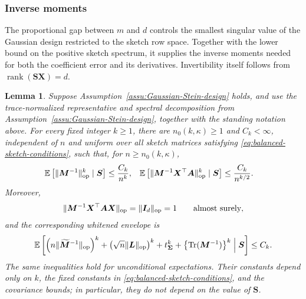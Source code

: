 \documentclass{article}
\theoremstyle{plain}
\newtheorem{lemma}[theorem]{Lemma}
\theoremstyle{definition}
\theoremstyle{definition}
\DeclarePairedDelimiter\norm{\lVert}{\rVert}
\DeclareMathOperator{\trace}{Tr}
\DeclareMathOperator{\rank}{rank}
\def\E{{\mathbb{E}}}
\def\mathbold{\boldsymbol}
\def\cal{\mathcal}
\def\bA{\mathbold{A}}\def\calA{{\cal A}}\def\scrA{{\mathscr A}}\def\Ahat{\widehat{A}}\def\Atil{{\widetilde A}}
\def\bI{\mathbold{I}}\def\hbI{{\widehat{\bI}}}\def\tbI{{\widetilde{\bI}}}
\def\bL{\mathbold{L}}\def\hbL{{\widehat{\bL}}}\def\tbL{{\widetilde{\bL}}}
\def\bM{\mathbold{M}}\def\hbM{{\widehat{\bM}}}\def\tbM{{\widetilde{\bM}}}
\def\bS{\mathbold{S}}\def\hbS{{\widehat{\bS}}}\def\tbS{{\widetilde{\bS}}}
\def\bX{\mathbold{X}}\def\hbX{{\widehat{\bX}}}\def\tbX{{\tilde{\bX}}}\def\bXbar{{\overline \bX}}
\def\bSigma{\mathbold{\Sigma}}\def\hbSigma{{\widehat{\bSigma}}}
\begin{document}
\subsubsection{Inverse moments}

The proportional gap between $m$ and $d$ controls the smallest singular
value of the Gaussian design restricted to the sketch row space.  Together
with the lower bound on the positive sketch spectrum, it supplies the
inverse moments needed for both the coefficient error and its derivatives.
Invertibility itself follows from $\rank(\bS\bX)=d$.

\begin{lemma}
\label{lem:M-inverse-bound}
Suppose Assumption~\ref{assu:Gaussian-Stein-design} holds, and use the
trace-normalized
representative and spectral decomposition from
Assumption~\ref{assu:Gaussian-Stein-design}, together with the standing
notation above.
For every fixed integer $k\geq1$, there are $n_0(k,\kappa)\geq1$ and
$C_k<\infty$, independent of $n$ and uniform over all sketch matrices
satisfying \eqref{eq:balanced-sketch-conditions}, such that, for
$n\geq n_0(k,\kappa)$,
\begin{align}
    \E\left[\norm{\bM^{-1}}_{\rm op}^k\mid\bS\right]
    &\leq \frac{C_k}{n^k},
    &
    \E\left[\norm{\bM^{-1}\bX^\top\bA}_{\rm op}^k\mid\bS\right]
    &\leq \frac{C_k}{n^{k/2}}.
    \label{eq:M-inverse-moments}
\end{align}
Moreover,
\begin{align}
    \norm{\bM^{-1}\bX^\top\bA\bX}_{\rm op}
    =\norm{\bI_d}_{\rm op}=1
    \qquad\text{almost surely},
    \label{eq:M-inverse-normal-equation}
\end{align}
and the corresponding whitened envelope is
\begin{align}
    \E\left[
       \left(n\norm{\widetilde{\bM}^{-1}}_{\rm op}\right)^k
       +\left(\sqrt n\norm{\bL}_{\rm op}\right)^k
       +t_{\bSigma}^k
       +\left\{\trace(\bM^{-1})\right\}^k
       \mathrel{\Big|}\bS
    \right]
    \leq C_k.
    \label{eq:M-inverse-whitened-envelope}
\end{align}
The same inequalities hold for unconditional expectations.  Their constants
depend only on $k$, the fixed constants in
\eqref{eq:balanced-sketch-conditions}, and the covariance bounds; in
particular, they do not depend on the value of $\bS$.
\end{lemma}
\end{document}
